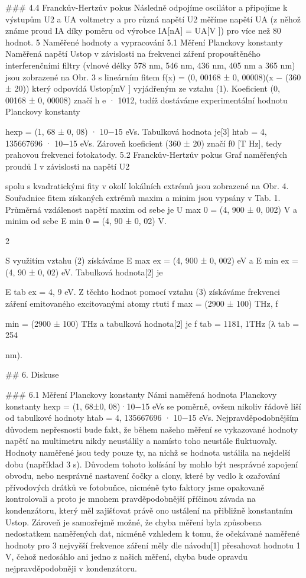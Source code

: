 \documentclass{article}
\begin{document}
### 4.4 Franckův-Hertzův pokus
Následně odpojíme oscilátor a připojíme k výstupům U2 a UA voltmetry a pro různá napětí U2 měříme napětí
UA (z něhož známe proud IA díky poměru od výrobce IA[nA] = UA[V ]) pro více než 80 hodnot.
5 Naměřené hodnoty a vypracování
5.1 Měření Planckovy konstanty
Naměřená napětí Ustop v závislosti na frekvenci záření propouštěného interferenčními filtry (vlnové délky 578
nm, 546 nm, 436 nm, 405 nm a 365 nm) jsou zobrazené na Obr. 3 s lineárním fitem
f(x) = (0, 00168 ± 0, 00008)(x − (360 ± 20)) který odpovídá Ustop[mV ] vyjádřeným ze vztahu (1). Koeficient
(0, 00168 ± 0, 00008) značí
h
e
· 1012, tudíž dostáváme experimentální hodnotu Planckovy konstanty

hexp = (1, 68 ± 0, 08) · 10−15 eVs. Tabulková hodnota je[3] htab = 4, 135667696 · 10−15 eVs. Zároveň koeficient (360 ± 20)
značí f0
[T Hz], tedy prahovou frekvenci fotokatody.
5.2 Franckův-Hertzův pokus
Graf naměřených proudů I v závislosti na napětí U2

spolu s kvadratickými fity v okolí lokálních extrémů jsou
zobrazené na Obr. 4. Souřadnice fitem získaných extrémů maxim a minim jsou vypsány v Tab. 1. Průměrná
vzdálenost napětí maxim od sebe je U
max
0 = (4, 900 ± 0, 002) V a minim od sebe E
min
0 = (4, 90 ± 0, 02) V.

2

S využitím vztahu (2) získáváme E
max
ex = (4, 900 ± 0, 002) eV a E
min
ex = (4, 90 ± 0, 02) eV. Tabulková hodnota[2]
je

E
tab
ex = 4, 9 eV.
Z těchto hodnot pomocí vztahu (3) získáváme frekvenci záření emitovaného excitovanými atomy rtuti
f
max = (2900 ± 100) THz, f

min = (2900 ± 100) THz a tabulková hodnota[2]
je f
tab = 1181, 1THz (λ
tab = 254

nm).


## 6. Diskuse

### 6.1 Měření Planckovy konstanty
Námi naměřená hodnota Planckovy konstanty hexp = (1, 68±0, 08)·10−15 eVs se poměrně, ovšem nikoliv řádově
liší od tabulkové hodnoty htab = 4, 135667696 · 10−15 eVs. Nejpravděpodobnějším důvodem nepřesnosti bude fakt,
že během našeho měření se vykazované hodnoty napětí na multimetru nikdy neustálily a namísto toho neustále
fluktuovaly. Hodnoty naměřené jsou tedy pouze ty, na nichž se hodnota ustálila na nejdelší dobu (například 3 s).
Důvodem tohoto kolísání by mohlo být nesprávné zapojení obvodu, nebo nesprávné nastavení čočky a clony, které
by vedlo k ozařování přívodových drátků ve fotobuňce, nicméně tyto faktory jsme opakovaně kontrolovali a proto je
mnohem pravděpodobnější příčinou závada na kondenzátoru, který měl zajišťovat právě ono ustálení na přibližně
konstantním Ustop. Zároveň je samozřejmě možné, že chyba měření byla způsobena nedostatkem naměřených dat,
nicméně vzhledem k tomu, že očekávané naměřené hodnoty pro 3 nejvyšší frekvence záření měly dle návodu[1]
přesahovat hodnotu 1 V, čehož nedosáhlo ani jedno z našich měření, chyba bude opravdu nejpravděpodobněji v
kondenzátoru.
\end{document}
